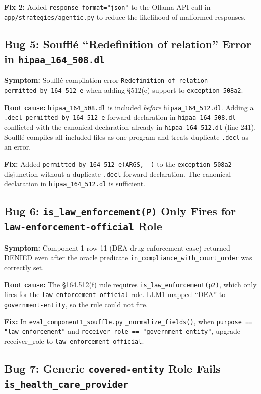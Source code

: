 \documentclass[11pt,letterpaper]{article}
\begin{document}
\begin{appendices}
\textbf{Fix 2:} Added \texttt{response\_format="json"} to the Ollama API call in \texttt{app/strategies/agentic.py} to reduce the likelihood of malformed responses.

\subsection{Bug 5: Souffl\'{e} ``Redefinition of relation'' Error in \texttt{hipaa\_164\_508.dl}}

\textbf{Symptom:} Souffl\'{e} compilation error \texttt{Redefinition of relation permitted\_by\_164\_512\_e} when adding \S 512(e) support to \texttt{exception\_508a2}.

\textbf{Root cause:} \texttt{hipaa\_164\_508.dl} is included \emph{before} \texttt{hipaa\_164\_512.dl}. Adding a \texttt{.decl permitted\_by\_164\_512\_e} forward declaration in \texttt{hipaa\_164\_508.dl} conflicted with the canonical declaration already in \texttt{hipaa\_164\_512.dl} (line 241). Souffl\'{e} compiles all included files as one program and treats duplicate \texttt{.decl} as an error.

\textbf{Fix:} Added \texttt{permitted\_by\_164\_512\_e(ARGS, \_)} to the \texttt{exception\_508a2} disjunction without a duplicate \texttt{.decl} forward declaration. The canonical declaration in \texttt{hipaa\_164\_512.dl} is sufficient.

\subsection{Bug 6: \texttt{is\_law\_enforcement(P)} Only Fires for \texttt{law-enforcement-official} Role}

\textbf{Symptom:} Component 1 row 11 (DEA drug enforcement case) returned DENIED even after the oracle predicate \texttt{in\_compliance\_with\_court\_order} was correctly set.

\textbf{Root cause:} The \S 164.512(f) rule requires \texttt{is\_law\_enforcement(p2)}, which only fires for the \texttt{law-enforcement-official} role. LLM1 mapped ``DEA'' to \texttt{government-entity}, so the rule could not fire.

\textbf{Fix:} In \texttt{eval\_component1\_souffle.py} \texttt{\_normalize\_fields()}, when \texttt{purpose == "law-enforcement"} and \texttt{receiver\_role == "government-entity"}, upgrade receiver\_role to \texttt{law-enforcement-official}.

\subsection{Bug 7: Generic \texttt{covered-entity} Role Fails \texttt{is\_health\_care\_provider}}


\end{appendices}
\end{document}
